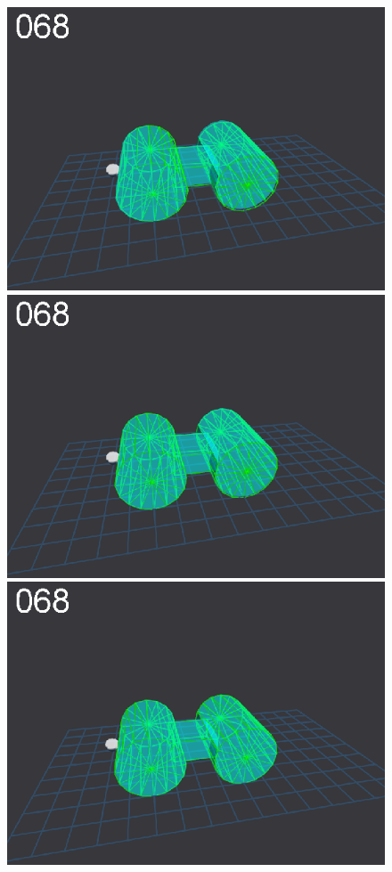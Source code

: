 \begin{figure}[t]
{\includegraphics[width=\imgCXwid]{images/C5_1exp_6_1}
\includegraphics[width=\imgCXwid]{images/C5_2exp_6_1}
\includegraphics[width=\imgCXwid]{images/C5_3exp_6_1}
}
\end{figure}
